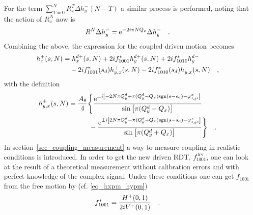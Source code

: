 %
For the term $\sum\limits_{T = 0}^N R_x^{T}\Delta h_y^-(N-T) $ a similar process is performed, noting that
the action of $R_x^N$ now is 
%
\begin{equation}
R^N\Delta h_y^- = \text{e}^{-2 i \pi N Q_x} \Delta h_y^-
\quad .
\end{equation}
%
Combining the above, the expression for the coupled driven motion becomes
%
\begin{align}
    h_x^+(s,N)&=
    h_x^{d+}(s,N) + 2if^{*}_{1001}  h_y^{d+}(s,N) + 2if^{*}_{1010} h_y^{d-} \notag \\
    &\quad
    -2if^*_{1001}(s_d) h_{y,x}^+(s,N)
    -2if^*_{1010}(s_d) h_{y,x}^-(s,N)
    \quad ,
\end{align}
with the definition
%
\begin{align}
    h_{y,x}^\pm(s,N) &= 
        \frac{A_\theta}{4} \Bigg\{
             \frac{\text{e}^{\pm i \left[-2N \pi Q_y^d + \pi( Q_y^d - Q_x )\text{sgn}(s-s_d) - \varphi_{s_ds}^{x}\right]}}
                {\sin\left[\pi (Q_y^d - Q_x)\right]}
                \notag \\  & \quad\quad\quad
            -\frac{\text{e}^{ \pm i \left[2N\pi Q_y^d - \pi( Q_y^d + Q_x )\text{sgn}(s-s_d) - \varphi_{s_ds}^{x}\right]}}
                {\sin\left[\pi (Q_y^d + Q_x)\right]}
        \Bigg\}
        \quad .
\end{align}
%
%
In section~\ref{sec_coupling_measurement} a way to measure coupling in realistic conditions is introduced.
In order to get the new driven RDT, $f_{1001}^\text{drv}$, one can look at the result of a theoretical
measurement without calibration errors and with perfect knowledge of the complex signal.
Under these conditions one can get $f_{1001}$ from the free motion by (cf. \eqref{eq_hxpm_hypm})
%
\begin{equation}
    f_{1001}^* = \frac{H^+(0,1)}{2iV^+(0,1)}
    \label{eq_f1001_from_complex}
    \quad .
\end{equation}
